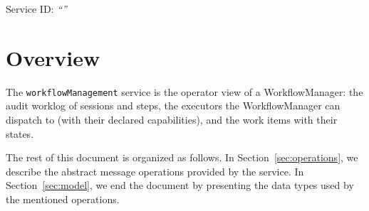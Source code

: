 \documentclass[a4paper]{arrowhead}
\begin{document}
\ArrowheadSetup

\begin{center}
  \vspace*{1cm}
  \huge{\arrowtitle}

  \vspace*{0.2cm}
  \LARGE{\arrowtype}
  \vspace*{1cm}

  \Large{Service ID: \textit{``\arrowid''}}
  \vspace*{\fill}

  

  \vspace*{1cm}
  \vspace*{\fill}

  \begin{abstract}
    This document describes the \texttt{workflowManagement} service of the Eclipse Arrowhead workflow support systems, which gives operators the worklog, the known executors and the work items. It is provided by the WorkflowManager system, service version 1.0.0, documentation edition 5.4.0.
  \end{abstract}

  \vspace*{1cm}
\end{center}

\newpage

\tableofcontents
\newpage

\section{Overview}
\label{sec:overview}
The \texttt{workflowManagement} service is the operator view of a WorkflowManager: the audit worklog
of sessions and steps, the executors the WorkflowManager can dispatch to (with their declared capabilities), and the
work items with their states.

The rest of this document is organized as follows.
In Section~\ref{sec:operations}, we describe the abstract message operations provided by the service.
In Section~\ref{sec:model}, we end the document by presenting the data types used by the mentioned operations.
\end{document}
